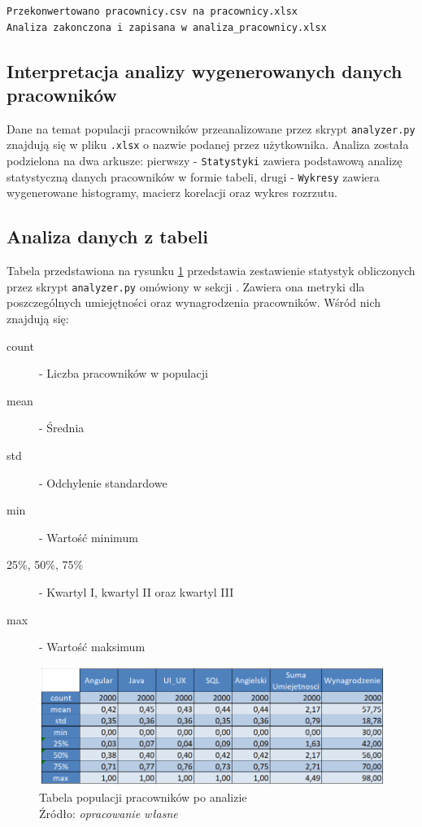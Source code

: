\begin{lstlisting}[language=bash, caption=Terminal po zakończeniu skryptu\\ Źródło:\textit{ opracowanie własne}]
Przekonwertowano pracownicy.csv na pracownicy.xlsx
Analiza zakonczona i zapisana w analiza_pracownicy.xlsx    
\end{lstlisting}

    \subsection{Interpretacja analizy wygenerowanych danych pracowników}\label{subsec:analiza_wejscie}
    \par Dane na temat populacji pracowników przeanalizowane przez skrypt \verb|analyzer.py| znajdują się w pliku \verb|.xlsx| o nazwie podanej przez użytkownika. Analiza została podzielona na dwa arkusze: pierwszy - \verb|Statystyki| zawiera podstawową analizę statystyczną danych pracowników w formie tabeli, drugi - \verb|Wykresy| zawiera wygenerowane histogramy, macierz korelacji oraz wykres rozrzutu.

    \subsection{Analiza danych z tabeli}\label{subsec:tabela_populacja}
    \par Tabela przedstawiona na rysunku \ref{fig:tabela_analiza} przedstawia zestawienie statystyk obliczonych przez skrypt \verb|analyzer.py| omówiony w sekcji . Zawiera ona metryki dla poszczególnych umiejętności oraz wynagrodzenia pracowników. Wśród nich znajdują się:
    \begin{description}
        \item[count] - Liczba pracowników w populacji
        \item[mean] - Średnia
        \item[std] - Odchylenie standardowe
        \item[min] - Wartość minimum
        \item[25\%, 50\%, 75\%] - Kwartyl I, kwartyl II oraz kwartyl III
        \item[max] - Wartość maksimum
    \end{description}

    \begin{figure}[H]
        \includegraphics[width=\linewidth]{chapters/Images/analiza_tabela_all.png}
        \cprotect\caption{Tabela populacji pracowników po analizie\\ Źródło:\textit{ opracowanie własne}}
        \label{fig:tabela_analiza}
    \end{figure}

